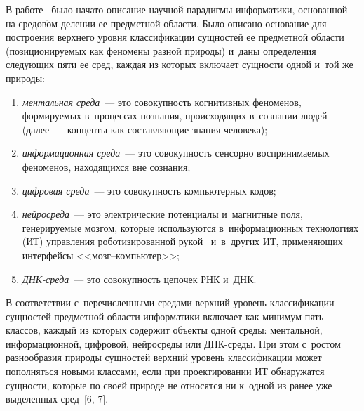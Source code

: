 \begin{multicols}{2}
\vspace*{-3pt}
  
  В работе~\cite{4-zatsm} было начато описание научной парадигмы 
информатики, основанной на средов$\acute{\mbox{о}}$м 
 делении ее 
предметной об\-ласти. Было описано основание для по\-стро\-ения верх\-не\-го уров\-ня 
классификации сущностей ее предметной об\-ласти (по\-зи\-ци\-о\-ни\-ру\-емых как 
феномены раз\-ной природы) и~даны определения сле\-ду\-ющих пяти ее сред, 
каж\-дая из которых включает сущности одной и~той же при\-роды:
\begin{enumerate}[(1)]
\item \textit{ментальная среда}~--- это со\-во\-куп\-ность когнитивных 
феноменов, фор\-ми\-ру\-емых в~процессах познания, происходящих в~сознании 
людей (далее~--- концепты как со\-став\-ля\-ющие знания человека);
\item \textit{информационная среда}~--- это со\-во\-куп\-ность сенсорно 
вос\-при\-ни\-ма\-емых феноменов, находящихся вне со\-зна\-ния;
\item \textit{цифровая среда}~--- это со\-во\-куп\-ность компьютерных кодов;
\item \textit{нейросреда}~--- это электрические потенциалы и~магнитные 
поля, генерируемые мозгом, которые используются в~информационных 
технологиях (ИТ) управ\-ле\-ния роботизированной рукой~\cite{5-zatsm} 
и~в~других ИТ, при\-ме\-ня\-ющих интерфейсы <<мозг--ком\-пью\-тер>>;
\item \textit{ДНК-среда}~--- это со\-во\-куп\-ность цепочек РНК и~ДНК.
\end{enumerate}

  В соответствии с~пе\-ре\-чис\-лен\-ны\-ми средами верх\-ний уровень классификации 
сущностей предметной об\-ласти информатики включает как минимум пять 
классов, каж\-дый из которых содержит объекты одной среды: ментальной, 
информационной, циф\-ро\-вой, нейросреды или ДНК-сре\-ды. При этом  
с~рос\-том разнообразия природы сущностей верх\-ний уровень классификации 
может пополняться новыми классами, если при проектировании ИТ 
обнаружатся сущности, которые по своей природе не относятся ни к~одной из 
ранее уже выделенных сред~[6, 7].

\setcounter{figure}{1}
\begin{figure*} %
\vspace*{1pt}
\begin{center}
   \mbox{%
\epsfxsize=110mm 
}
\end{center}
\vspace*{-10pt}
\vspace*{-3pt}
\end{figure*}


\end{multicols}
